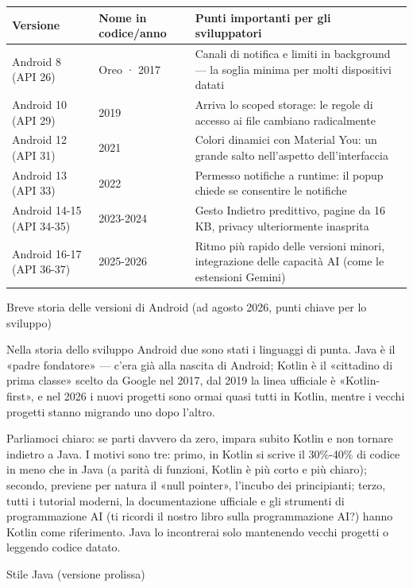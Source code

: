 \begin{center}
\begin{tabularx}{\linewidth}{|X|X|X|}
\hline
\textbf{Versione} & \textbf{Nome in codice/anno} & \textbf{Punti importanti per gli sviluppatori} \tabularnewline
\hline
Android 8 (API 26) & Oreo · 2017 & Canali di notifica e limiti in background — la soglia minima per molti dispositivi datati \tabularnewline
Android 10 (API 29) & 2019 & Arriva lo scoped storage: le regole di accesso ai file cambiano radicalmente \tabularnewline
Android 12 (API 31) & 2021 & Colori dinamici con Material You: un grande salto nell'aspetto dell'interfaccia \tabularnewline
Android 13 (API 33) & 2022 & Permesso notifiche a runtime: il popup chiede se consentire le notifiche \tabularnewline
Android 14-15 (API 34-35) & 2023-2024 & Gesto Indietro predittivo, pagine da 16 KB, privacy ulteriormente inasprita \tabularnewline
Android 16-17 (API 36-37) & 2025-2026 & Ritmo più rapido delle versioni minori, integrazione delle capacità AI (come le estensioni Gemini) \tabularnewline
\hline
\end{tabularx}
\end{center}

\begin{center}\small\color{gray}Breve storia delle versioni di Android (ad agosto 2026, punti chiave per lo sviluppo)\end{center}


Nella storia dello sviluppo Android due sono stati i linguaggi di punta. Java è il «padre fondatore» — c'era già alla nascita di Android; Kotlin è il «cittadino di prima classe» scelto da Google nel 2017, dal 2019 la linea ufficiale è «Kotlin-first», e nel 2026 i nuovi progetti sono ormai quasi tutti in Kotlin, mentre i vecchi progetti stanno migrando uno dopo l'altro.

Parliamoci chiaro: se parti davvero da zero, impara subito Kotlin e non tornare indietro a Java. I motivi sono tre: primo, in Kotlin si scrive il 30\%-40\% di codice in meno che in Java (a parità di funzioni, Kotlin è più corto e più chiaro); secondo, previene per natura il «null pointer», l'incubo dei principianti; terzo, tutti i tutorial moderni, la documentazione ufficiale e gli strumenti di programmazione AI (ti ricordi il nostro libro sulla programmazione AI?) hanno Kotlin come riferimento. Java lo incontrerai solo mantenendo vecchi progetti o leggendo codice datato.

Stile Java (versione prolissa)

